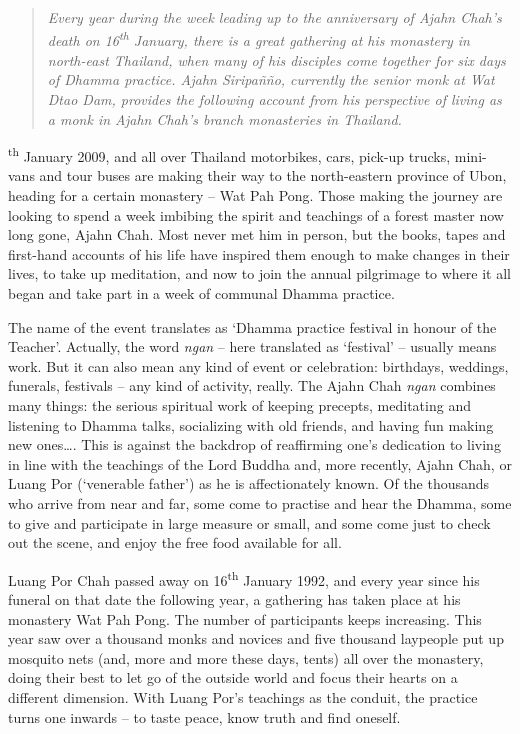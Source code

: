 
\begin{quote}\itshape
Every year during the week leading up to the anniversary of Ajahn
Chah's death on 16\textsuperscript{th} January, there is a great
gathering at his monastery in north-east Thailand, when many of his
disciples come together for six days of Dhamma practice. Ajahn
Siripañño, currently the senior monk at Wat Dtao Dam, provides the
following account from his perspective of living as a monk in Ajahn
Chah's branch monasteries in Thailand.
\end{quote}

\textsuperscript{th} January 2009, and all over Thailand motorbikes,
cars, pick-up trucks, mini-vans and tour buses are making their way to
the north-eastern province of Ubon, heading for a certain monastery --
Wat Pah Pong. Those making the journey are looking to spend a week
imbibing the spirit and teachings of a forest master now long gone,
Ajahn Chah. Most never met him in person, but the books, tapes and
first-hand accounts of his life have inspired them enough to make changes
in their lives, to take up meditation, and now to join the annual
pilgrimage to where it all began and take part in a week of communal
Dhamma practice. 

The name of the event translates as `Dhamma practice festival in honour
of the Teacher'. Actually, the word \emph{ngan} -- here translated as
`festival' -- usually means work. But it can also mean any kind of event
or celebration: birthdays, weddings, funerals, festivals -- any kind of
activity, really. The Ajahn Chah \emph{ngan} combines many things: the
serious spiritual work of keeping precepts, meditating and listening to
Dhamma talks, socializing with old friends, and having fun making new
ones\ldots{}. This is against the backdrop of reaffirming one's
dedication to living in line with the teachings of the Lord Buddha and, 
more recently, Ajahn Chah, or Luang Por (`venerable father') as he is
affectionately known. Of the thousands who arrive from near and far, 
some come to practise and hear the Dhamma, some to give and participate
in large measure or small, and some come just to check out the scene, 
and enjoy the free food available for all. 

Luang Por Chah passed away on 16\textsuperscript{th} January 1992, and every year since
his funeral on that date the following year, a gathering has taken place
at his monastery Wat Pah Pong. The number of participants keeps
increasing. This year saw over a thousand monks and novices and five
thousand laypeople put up mosquito nets (and, more and more these days, 
tents) all over the monastery, doing their best to let go of the outside
world and focus their hearts on a different dimension. With Luang Por's
teachings as the conduit, the practice turns one inwards -- to taste
peace, know truth and find oneself. 

